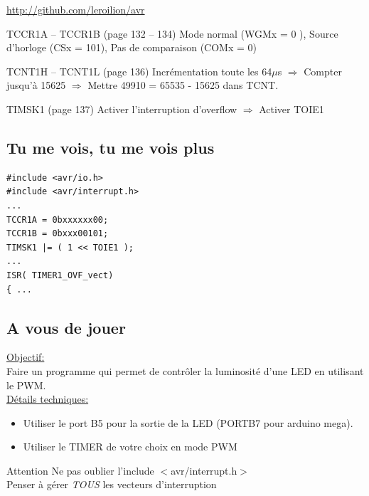 \documentclass{beamer}
\begin{document}
\begin{frame}
  \hyperlink{http://github.com/leroilion/avr/tree/master/datasheet/Atmegaxx8.pdf}{http://github.com/leroilion/avr}
  \pause
  \begin{block}{TCCR1A -- TCCR1B (page 132 -- 134)}
    Mode normal (WGMx = 0 ), Source d'horloge (CSx = 101), Pas de comparaison (COMx = 0) 
  \end{block}
  \pause
  \begin{block}{TCNT1H -- TCNT1L (page 136) }
    Incr\'ementation toute les 64$\mu$s \pause $\Longrightarrow$ Compter jusqu'\`a 15625 \pause $\Longrightarrow$ Mettre 49910 = 65535 - 15625 dans TCNT.
  \end{block}
  \pause
  \begin{block}{TIMSK1 (page 137)}
    Activer l'interruption d'overflow \pause $\Longrightarrow$ Activer TOIE1
  \end{block}
\end{frame}

\subsection{Tu me vois, tu me vois plus}

\lstset{language=c++} 
\lstset{commentstyle=\textit} 
\begin{lstlisting}
#include <avr/io.h>
#include <avr/interrupt.h>
...
TCCR1A = 0bxxxxxx00;
TCCR1B = 0bxxx00101;
TIMSK1 |= ( 1 << TOIE1 );
...
ISR( TIMER1_OVF_vect)
{ ...
\end{lstlisting}

\subsection{A vous de jouer}

\begin{frame}
  \underline{Objectif:}\\
  Faire un programme qui permet de contr\^oler la luminosit\'e d'une LED en utilisant le PWM.\\
  \pause
  \underline{D\'etails techniques:}\\
  \begin{itemize}
    \pause
    \item Utiliser le port B5 pour la sortie de la LED (PORTB7 pour arduino mega).
    \pause
    \item Utiliser le TIMER de votre choix en mode PWM
  \end{itemize}

  \pause
  \begin{alertblock}{Attention}
    Ne pas oublier l'include $<$avr/interrupt.h$>$\\
    Penser \`a g\'erer \emph{TOUS} les vecteurs d'interruption
  \end{alertblock}
\end{frame}
\end{document}
